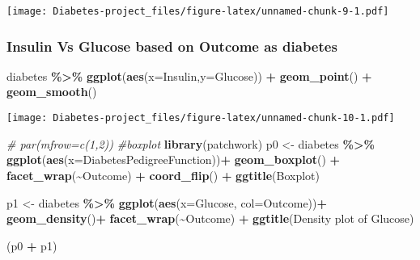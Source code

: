 \documentclass[
]{article}
\newenvironment{Shaded}{\begin{snugshade}}{\end{snugshade}}
\newcommand{\AttributeTok}[1]{\textcolor[rgb]{0.13,0.29,0.53}{#1}}
\newcommand{\CommentTok}[1]{\textcolor[rgb]{0.56,0.35,0.01}{\textit{#1}}}
\newcommand{\FunctionTok}[1]{\textcolor[rgb]{0.13,0.29,0.53}{\textbf{#1}}}
\newcommand{\NormalTok}[1]{#1}
\newcommand{\OtherTok}[1]{\textcolor[rgb]{0.56,0.35,0.01}{#1}}
\newcommand{\SpecialCharTok}[1]{\textcolor[rgb]{0.81,0.36,0.00}{\textbf{#1}}}
\newcommand{\StringTok}[1]{\textcolor[rgb]{0.31,0.60,0.02}{#1}}
\begin{document}
\texttt{[image: Diabetes-project\_files/figure-latex/unnamed-chunk-9-1.pdf]}

\hypertarget{insulin-vs-glucose-based-on-outcome-as-diabetes}{%
\subsubsection{Insulin Vs Glucose based on Outcome as
diabetes}\label{insulin-vs-glucose-based-on-outcome-as-diabetes}}

\begin{Shaded}
\begin{Highlighting}[]
\NormalTok{diabetes }\SpecialCharTok{\%\textgreater{}\%} 
  \FunctionTok{ggplot}\NormalTok{(}\FunctionTok{aes}\NormalTok{(}\AttributeTok{x=}\NormalTok{Insulin,}\AttributeTok{y=}\NormalTok{Glucose)) }\SpecialCharTok{+}
    \FunctionTok{geom\_point}\NormalTok{() }\SpecialCharTok{+}
  \FunctionTok{geom\_smooth}\NormalTok{()}
\end{Highlighting}
\end{Shaded}

\texttt{[image: Diabetes-project\_files/figure-latex/unnamed-chunk-10-1.pdf]}

\begin{Shaded}
\begin{Highlighting}[]
\CommentTok{\# par(mfrow=c(1,2))}
\CommentTok{\#boxplot}
\FunctionTok{library}\NormalTok{(patchwork)}
\NormalTok{p0 }\OtherTok{\textless{}{-}}\NormalTok{ diabetes }\SpecialCharTok{\%\textgreater{}\%} 
  \FunctionTok{ggplot}\NormalTok{(}\FunctionTok{aes}\NormalTok{(}\AttributeTok{x=}\NormalTok{DiabetesPedigreeFunction))}\SpecialCharTok{+}
  \FunctionTok{geom\_boxplot}\NormalTok{() }\SpecialCharTok{+}
  \FunctionTok{facet\_wrap}\NormalTok{(}\SpecialCharTok{\textasciitilde{}}\NormalTok{Outcome) }\SpecialCharTok{+} \FunctionTok{coord\_flip}\NormalTok{() }\SpecialCharTok{+}
  \FunctionTok{ggtitle}\NormalTok{(}\StringTok{\textquotesingle{}Boxplot\textquotesingle{}}\NormalTok{)}

\NormalTok{p1 }\OtherTok{\textless{}{-}}\NormalTok{ diabetes }\SpecialCharTok{\%\textgreater{}\%} 
  \FunctionTok{ggplot}\NormalTok{(}\FunctionTok{aes}\NormalTok{(}\AttributeTok{x=}\NormalTok{Glucose, }\AttributeTok{col=}\NormalTok{Outcome))}\SpecialCharTok{+}
    \FunctionTok{geom\_density}\NormalTok{()}\SpecialCharTok{+}
    \FunctionTok{facet\_wrap}\NormalTok{(}\SpecialCharTok{\textasciitilde{}}\NormalTok{Outcome) }\SpecialCharTok{+}
    \FunctionTok{ggtitle}\NormalTok{(}\StringTok{\textquotesingle{}Density plot of Glucose\textquotesingle{}}\NormalTok{)}

\NormalTok{(p0 }\SpecialCharTok{+}\NormalTok{ p1)}
\end{Highlighting}
\end{Shaded}
\end{document}
